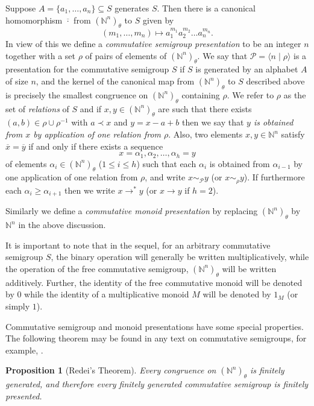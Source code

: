 \documentclass[12pt]{article}
\def\N{{\mathbb{N}}}
\newtheorem{proposition}{\bf Proposition}
\begin{document}
Suppose $A = \{a_1, \ldots, a_n\} \subseteq S$ generates 
$S$. Then there is a canonical homomorphism $\overline{\cdot}$
from $(\N^n)_\theta$ to $S$ given by 
$$(m_1, \ldots, m_n) \mapsto a_1^{m_1} a_2^{m_2} \ldots a_n^{m_n}.$$
In view of this we define a {\em commutative semigroup presentation} to
be an integer $n$ together with a set $\rho$ of pairs of elements 
of $(\N^n)_\theta$. We say that $\mathcal{P}=\langle n  \mid \rho \rangle$
is a presentation for the commutative semigroup $S$ if $S$ is generated
by an alphabet  $A$ of size $n$, and the kernel of the canonical map
from $(\N^n)_\theta$ to $S$ described above is precisely the smallest
congruence on $(\N^n)_\theta$ containing $\rho$.
We refer to $\rho$ as the set of \emph{relations} of $S$ and if
$x,y\in (\mathbb{N}^n)_{\theta}$ are such that there exists 
$(a,b)\in \rho \cup \rho^{-1}$
with $a \prec x$ and  $y=x-a+b$ then we say that \emph{$y$ is obtained
from $x$ by application of one relation from $\rho$}.
Also, two elements $x,y\in\mathbb{N}^n$ satisfy $\overline{x}=
\overline{y}$ if and only if there exists a sequence 
$$x=\alpha_1,\alpha_2,\ldots,\alpha_h=y$$
of elements $\alpha_i\in(\mathbb{N}^n)_{\theta}$ ($1\leq i\leq h$)
such that each $\alpha_i$ is obtained from $\alpha_{i-1}$ by
one application of one relation from $\rho$,
and write $x\sim_{\mathcal{P}}y$ (or $x\sim_{\rho}y$).
If furthermore each $\alpha_{i}\geq\alpha_{i+1}$  
then we write $x\rightarrow^*y$ (or $x\rightarrow y$ if $h=2$).

Similarly we define a \emph{commutative monoid presentation}
by replacing $(\mathbb{N}^n)_{\theta}$ by $\mathbb{N}^n$ in
the above discussion. 

It is important to note that in the sequel, for an arbitrary 
commutative semigroup $S$, the binary operation will generally 
be written multiplicatively, while the operation of the free 
commutative semigroup, $(\mathbb{N}^n)_\theta$ will be written 
additively. Further, the identity of the free commutative monoid 
will be denoted by $0$ while the identity of a multiplicative 
monoid $M$ will be denoted by $1_M$ (or simply $1$).

Commutative semigroup and monoid presentations have some special 
properties. The following theorem may be found in any text on 
commutative semigroups, for example, \cite{bRG99}.
\begin{proposition}[Redei's Theorem]\label{Redei}
Every congruence on $(\N^n)_\theta$ is finitely generated, 
and therefore every finitely generated commutative 
semigroup is finitely presented.
\end{proposition}
\end{document}
